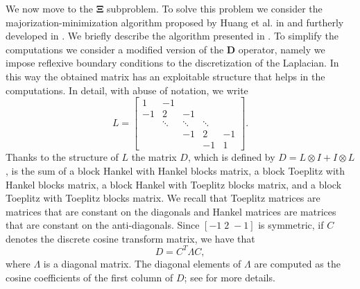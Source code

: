 \documentclass[final,leqno]{siamltex}
\begin{document}
We now move to the $\mathbf{\Xi}$ subproblem. To solve this problem we consider the majorization-minimization algorithm proposed by Huang et al. in \cite{HLMRS17} and furtherly developed in \cite{BDDMR20,BR19,BR20}. We briefly describe the algorithm presented in \cite{HLMRS17}. To simplify the computations we consider a modified version of the $\mathbf{D}$ operator, namely we impose reflexive boundary conditions to the discretization of the Laplacian. In this way the obtained matrix has an exploitable structure that helps in the computations. In detail, with abuse of notation, we write 
$$
{L}=\begin{bmatrix}
1&-1\\
-1&2&-1\\
&  \ddots&\ddots&\ddots\\
&  &      -1&2&-1\\
&  &      &  -1&1
\end{bmatrix}.
$$
Thanks to the structure of $L$ the matrix $D$, which is defined by $D=L\otimes I+I\otimes L$, is the sum of a block Hankel with Hankel blocks matrix, a block Toeplitz with Hankel blocks matrix, a block Hankel with Toeplitz blocks matrix, and a block Toeplitz with Toeplitz blocks matrix. We recall that Toeplitz matrices are matrices that are constant on the diagonals and Hankel matrices are matrices that are constant on the anti-diagonals. Since $[-1\;2\;-1]$ is symmetric, if ${C}$ denotes the discrete cosine transform matrix, we have that
\begin{equation}\label{eq:fact}
{D}={C}^T{\Lambda}{C},
\end{equation}
where ${\Lambda}$ is a diagonal matrix. The diagonal elements of ${\Lambda}$ are computed as the cosine coefficients of the first column of ${D}$; see \cite{NC99} for more details.
\end{document}
